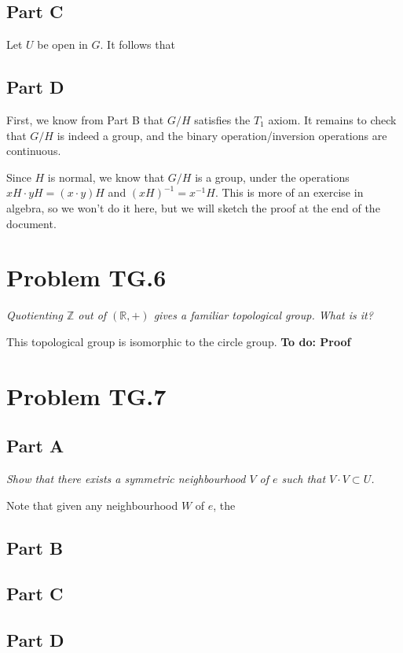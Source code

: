 \documentclass[10pt, oneside]{amsart}
\begin{document}
    \hrulefill

    \subsection{Part C}

    Let $U$ be open in $G$. It follows that 

    \hrulefill

    \subsection{Part D}

    First, we know from Part B that $G/H$ satisfies the $T_1$ axiom. It remains to check that $G/H$ is indeed a group, and the binary operation/inversion operations are continuous.
    \newline

    Since $H$ is normal, we know that $G/H$ is a group, under the operations $xH \cdot yH = (x \cdot y)H$ and $(xH)^{-1} = x^{-1}H$. This is more of an exercise in algebra, so
    we won't do it here, but we will sketch the proof at the end of the document.
    \newline

    \hrulefill

    \section{Problem TG.6}

    \textit{Quotienting $\mathbb{Z}$ out of $(\mathbb{R}, +)$ gives a familiar topological group. What is it?}
    \newline

    This topological group is isomorphic to the circle group. \textbf{To do: Proof}

    \hrulefill

    \section{Problem TG.7}

    \hrulefill

    \subsection{Part A}

    \textit{Show that there exists a symmetric neighbourhood $V$ of $e$ such that $V \cdot V \subset U$.}
    \newline

    Note that given any neighbourhood $W$ of $e$, the 

    \hrulefill

    \subsection{Part B}

    \hrulefill

    \subsection{Part C}

    \hrulefill

    \subsection{Part D}


    \hrulefill

    
\end{document}
